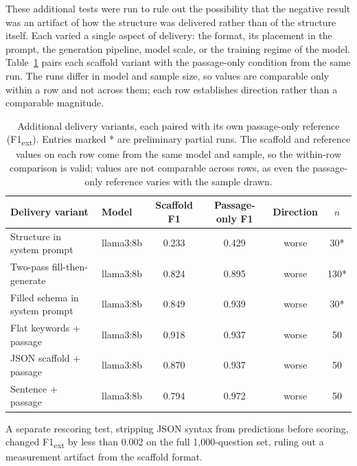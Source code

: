 \documentclass[master]{thesis}
\begin{document}
These additional tests were run to rule out the possibility that the negative result was an artifact of how the structure was delivered rather than of the structure itself. Each varied a single aspect of delivery: the format, its placement in the prompt, the generation pipeline, model scale, or the training regime of the model. Table~\ref{tab:exploratory} pairs each scaffold variant with the passage-only condition from the same run. The runs differ in model and sample size, so values are comparable only within a row and not across them; each row establishes direction rather than a comparable magnitude.

\begin{table}[h]
\centering
\begin{tabular}{llcccc}
\toprule
Delivery variant & Model & Scaffold F1 & Passage-only F1 & Direction & $n$ \\
\midrule
Structure in system prompt      & llama3:8b   & 0.233 & 0.429 & worse         & 30* \\
Two-pass fill-then-generate      & llama3:8b   & 0.824 & 0.895 & worse         & 130* \\
Filled schema in system prompt   & llama3:8b   & 0.849 & 0.939 & worse         & 30* \\
Flat keywords + passage          & llama3:8b   & 0.918 & 0.937 & worse         & 50 \\
JSON scaffold + passage          & llama3:8b   & 0.870 & 0.937 & worse         & 50 \\
Sentence + passage               & llama3:8b   & 0.794 & 0.972 & worse         & 50 \\
\bottomrule
\end{tabular}
\caption{Additional delivery variants, each paired with its own passage-only reference (F1\textsubscript{ext}). Entries marked * are preliminary partial runs. The scaffold and reference values on each row come from the same model and sample, so the within-row comparison is valid; values are not comparable across rows, as even the passage-only reference varies with the sample drawn.}
\label{tab:exploratory}
\end{table}

A separate rescoring test, stripping JSON syntax from predictions before scoring, changed F1\textsubscript{ext} by less than 0.002 on the full 1,000-question set, ruling out a measurement artifact from the scaffold format.
\end{document}
